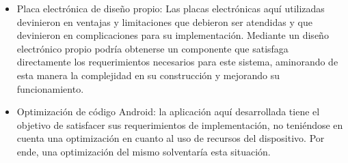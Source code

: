 \begin{itemize}
    \item Placa electrónica de diseño propio: Las placas electrónicas aquí utilizadas devinieron en ventajas y limitaciones que debieron ser atendidas y que devinieron en complicaciones para su implementación. Mediante un diseño electrónico propio podría obtenerse un componente que satisfaga directamente los requerimientos necesarios para este sistema, aminorando de esta manera la complejidad en su construcción y mejorando su funcionamiento.
    
    \item Optimización de código Android: la aplicación aquí desarrollada tiene el objetivo de satisfacer sus requerimientos de implementación, no teniéndose en cuenta una optimización en cuanto al uso de recursos del dispositivo. Por ende, una optimización del mismo solventaría esta situación.
    
    
\end{itemize}

\clearpage






